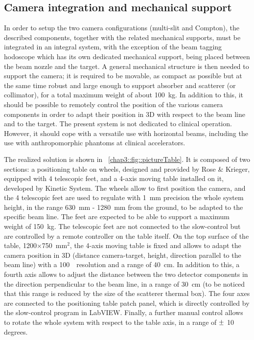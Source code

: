 
\subsection{Camera integration and mechanical support}\label{chap3::subsec::CameraMechanics}

In order to setup the two camera configurations (multi-slit and Compton), the described components, together with the related mechanical supports, must be integrated in an integral system, with the exception of the beam tagging hodoscope which has its own dedicated mechanical support, being placed between the beam nozzle and the target. A general mechanical structure is then needed to support the camera; it is required to be movable, as compact as possible but at the same time robust and large enough to support absorber and scatterer (or collimator), for a total maximum weight of about 100~kg. In addition to this, it should be possible to remotely control the position of the various camera components in order to adapt their position in 3D with respect to the beam line and to the target. The present system is not dedicated to clinical operation. However, it should cope with a versatile use with horizontal beams, including the use with anthropomorphic phantoms at clinical accelerators.

The realized solution is shown in \figurename~\ref{chap3::fig::pictureTable}. It is composed of two sections: a positioning table on wheels, designed and provided by Rose \& Krieger, equipped with 4 telescopic feet, and a 4-axis moving table installed on it, developed by Kinetic System. The wheels allow to first position the camera, and the 4 telescopic feet are used to regulate with 1~mm precision the whole system height, in the range 630~mm - 1280~mm from the ground, to be adapted to the specific beam line. The feet are expected to be able to support a maximum weight of 150~kg. The telescopic feet are not connected to the slow-control but are controlled by a remote controller on the table itself. On the top surface of the table, 1200$\times$750~mm$^2$, the 4-axis moving table is fixed and allows to adapt the camera position in 3D (distance camera-target, height, direction parallel to the beam line) with a 100~\charmum ~resolution and a range of 40~cm. In addition to this, a fourth axis allows to adjust the distance between the two detector components in the direction perpendicular to the beam line, in a range of 30~cm (to be noticed that this range is reduced by the size of the scatterer thermal box). The four axes are connected to the positioning table patch panel, which is directly controlled by the slow-control program in LabVIEW. Finally, a further manual control allows to rotate the whole system with respect to the table axis, in a range of $\varpm$ 10 degrees.

